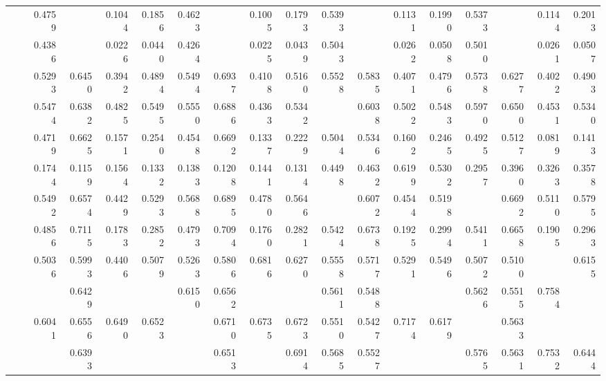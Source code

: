 {\begin{table*}[t]
{\begin{tabular}{|l|l|r|r|r|r|r|r|r|r|r|r|r|r|r|r|r|r|}
				\multirow{11}{*}{\rotatebox{90}{\Citeseer}} 
				&\ATC       & 0.4759 & \cellcolor{LightCyan}{0.8366} & 0.1044 & 0.1856 & 0.4623 & \cellcolor{LightCyan}{0.8344} & 0.1005 & 0.1793 & 0.5393 & \cellcolor{LightRed}{0.8288} & 0.1131 & 0.1990 & 0.5373 & \cellcolor{LightRed}{0.8357} & 0.1144 & 0.2013 \\
				&\CTC       & 0.4386 & \cellcolor{LightRed}{0.8585} & 0.0226 & 0.0440 & 0.4264 & \cellcolor{LightRed}{0.8653} & 0.0225 & 0.0439 & 0.5043 & \cellcolor{LightCyan}{0.8262} & 0.0262 & 0.0508 & 0.5010 & \cellcolor{LightCyan}{0.8293} & 0.0261 & 0.0507 \\\cline{2-18}
				&\MAML      & 0.5293 & 0.6450 & 0.3942 & 0.4894 & 0.5494 & 0.6937 & 0.4108 & 0.5160 & 0.5528 & 0.5835 & 0.4071 & 0.4796 & 0.5738 & 0.6277 & 0.4022 & 0.4903 \\
				&\Reptile   & 0.5474 & 0.6382 & 0.4825 & 0.5495 & 0.5550 & 0.6886 & 0.4363 & 0.5342 & \cellcolor{LightRed}{0.5812} & 0.6038 & 0.5022 & 0.5483 & 0.5970 & 0.6500 & 0.4531 & 0.5340 \\
				&\Featrans  & 0.4719 & 0.6625 & 0.1571 & 0.2540 & 0.4548 & 0.6692 & 0.1337 & 0.2229 & 0.5044 & 0.5346 & 0.1602 & 0.2465 & 0.4925 & 0.5127 & 0.0819 & 0.1413 \\
				&\PN        & 0.1744 & 0.1159 & 0.1564 & 0.1332 & 0.1383 & 0.1208 & 0.1441 & 0.1314 & 0.4498 & 0.4632 & 0.6199 & 0.5302 & 0.2957 & 0.3960 & 0.3263 & 0.3578 \\\cline{2-18}
				&\Supervise & 0.5492 & 0.6574 & 0.4429 & 0.5293 & 0.5688 & 0.6895 & 0.4780 & 0.5646 & \cellcolor{LightCyan}{0.5751} & 0.6072 & 0.4544 & 0.5198 & \cellcolor{LightRed}{0.6221} & 0.6692 & 0.5110 & 0.5795 \\
				&\ICSGNN    & 0.4856 & 0.7115 & 0.1783 & 0.2852 & 0.4793 & 0.7094 & 0.1760 & 0.2821 & 0.5424 & 0.6738 & 0.1925 & 0.2994 & 0.5411 & 0.6658 & 0.1905 & 0.2963 \\
				&\AQDGNN    &0.5036	&0.5993	&0.4406	&0.5079  &0.5263	&0.5806	&0.6816	&0.6270 &0.5558	&0.5717	&0.5291	&0.5496 &0.5072	&0.5100	&\cellcolor{LightRed}{0.7761}	&0.6155\\\cline{2-18}
				&\CGNPIP    & \cellcolor{LightCyan}{0.6076} & 0.6429 & \cellcolor{LightCyan}{0.7071} & \cellcolor{LightCyan}{0.6734} & 0.6150 & 0.6562 & \cellcolor{LightCyan}{0.7176} & \cellcolor{LightCyan}{0.6855} & 0.5611 & 0.5488 & \cellcolor{LightCyan}{0.7469} & \cellcolor{LightCyan}{0.6327} & 0.5626 & 0.5515 & 0.7584 & \cellcolor{LightCyan}{0.6386} \\
				&\CGNPMLP   & 0.6041 & 0.6556 & 0.6490 & 0.6523 & \cellcolor{LightRed}{0.6160} & 0.6710 & 0.6735 & 0.6723 & 0.5510 & 0.5427 & 0.7174 & 0.6179 & \cellcolor{LightCyan}{0.5773} & 0.5633 & \cellcolor{LightCyan}{0.7588} & \cellcolor{LightRed}{0.6466} \\
				&\CGNPGNN   & \cellcolor{LightRed}{0.6133} & 0.6393 & \cellcolor{LightRed}{0.7443} & \cellcolor{LightRed}{0.6878} &  \cellcolor{LightCyan}{0.6158} & 0.6513 & \cellcolor{LightRed}{0.7367} &\cellcolor{LightRed} {0.6914} & 0.5685 & 0.5527 & \cellcolor{LightRed}{0.7730} & \cellcolor{LightRed}{0.6446} & 0.5765 & 0.5631 & 0.7532 & 0.6444\\\hline\hline
				

\end{tabular}}
\end{table*}}

